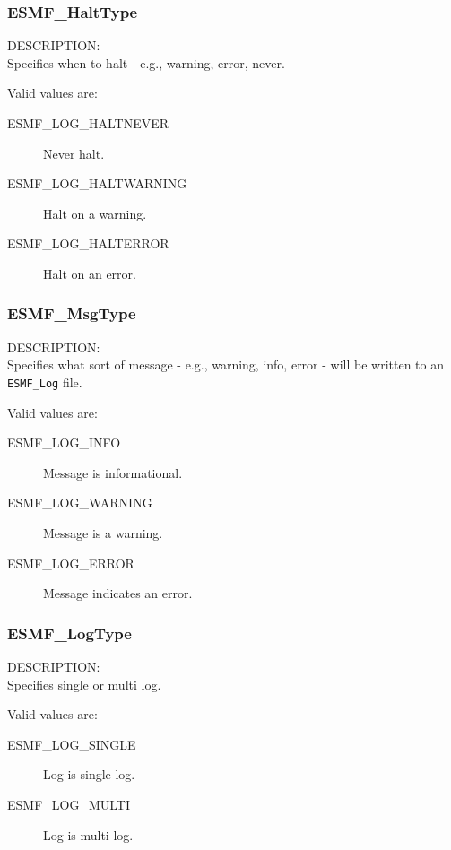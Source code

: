
\subsubsection{ESMF\_HaltType}

\label{opt:Halttype}
{\sf DESCRIPTION:\\}
Specifies when to halt - e.g., warning, error,
never.

Valid values are:
\begin{description}
   \item [ESMF\_LOG\_HALTNEVER] 
         Never halt.
   \item [ESMF\_LOG\_HALTWARNING]
         Halt on a warning.
   \item [ESMF\_LOG\_HALTERROR]
         Halt on an error.
\end{description}

\subsubsection{ESMF\_MsgType}

\label{opt:msgtype}
{\sf DESCRIPTION:\\}
Specifies what sort of message - e.g., warning, info,
error - will be written to an {\tt ESMF\_Log} file.

Valid values are:
\begin{description}
   \item [ESMF\_LOG\_INFO] 
         Message is informational.
   \item [ESMF\_LOG\_WARNING]
         Message is a warning.
   \item [ESMF\_LOG\_ERROR]
         Message indicates an error.
\end{description}

\subsubsection{ESMF\_LogType}

\label{opt:logtype}
{\sf DESCRIPTION:\\}
Specifies single or multi log.

Valid values are:
\begin{description}
   \item [ESMF\_LOG\_SINGLE] 
         Log is single log.
   \item [ESMF\_LOG\_MULTI]
         Log is multi log.
\end{description}





